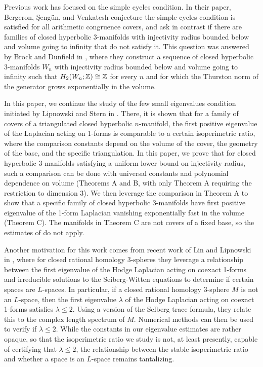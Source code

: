 {Previous work has focused on the simple cycles condition. In their paper, Bergeron, \c Seng\"un, and Venkatesh conjecture the simple cycles condition is satisfied for all arithmetic congruence covers, and ask in contrast if there are families of closed hyperbolic 3-manifolds with injectivity radius bounded below and volume going to infinity that do not satisfy it. This question was answered by Brock and Dunfield in \cite{BD}, where they construct a sequence of closed hyperbolic 3-manifolds $W_n$ with injectivity radius bounded below and volume going to infinity such that $H_2(W_n;{\mathbb Z})\cong {\mathbb Z}$ for every $n$ and for which the Thurston norm of the generator grows exponentially in the volume.

In this paper, we continue the study of the few small eigenvalues condition initiated by Lipnowski and Stern in \cite{LS}. There, it is shown that for a family of covers of a triangulated closed hyperbolic $n$-manifold, the first positive eigenvalue of the Laplacian acting on 1-forms is comparable to a certain isoperimetric ratio, where the comparison constants depend on the volume of the cover, the geometry of the base, and the specific triangulation. In this paper, we prove that for closed hyperbolic 3-manifolds satisfying a uniform lower bound on injectivity radius, such a comparison can be done with universal constants and polynomial dependence on volume (Theorems A and B, with only Theorem A requiring the restriction to dimension 3). We then leverage the comparison in Theorem A to show that a specific family of closed hyperbolic 3-manifolds have first positive eigenvalue of the 1-form Laplacian vanishing exponentially fast in the volume (Theorem C). The manifolds in Theorem C are not covers of a fixed base, so the estimates of \cite{LS} do not apply.

Another motivation for this work comes from recent work of Lin and Lipnowski in \cite{LL}, where for closed rational homology 3-spheres they leverage a relationship between the first eigenvalue of the Hodge Laplacian acting on coexact 1-forms and irreducible solutions to the Seiberg-Witten equations to determine if certain spaces are $L$-spaces. In particular, if a closed rational homology 3-sphere $M$ is not an $L$-space, then the first eigenvalue $\lambda$ of the Hodge Laplacian acting on coexact 1-forms satisfies $\lambda\leq 2$. Using a version of the Selberg trace formula, they relate this to the complex length spectrum of $M$. Numerical methods can then be used to verify if $\lambda \leq 2$. While the constants in our eigenvalue estimates are rather opaque, so that the isoperimetric ratio we study is not, at least presently, capable of certifying that $\lambda\leq 2$, the relationship between the stable isoperimetric ratio and whether a space is an $L$-space remains tantalizing.

}
